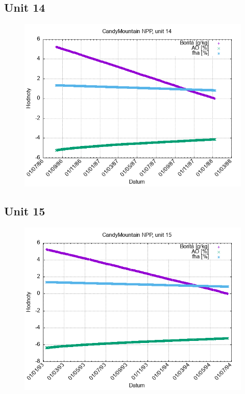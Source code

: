 \documentclass{article}
\begin{document}
\subsection*{Unit 14}
\begin{figure}[h!]
\centering
\includegraphics[width=14cm]{./grafy/CandyMountain14.png}
\end{figure}
\clearpage
\subsection*{Unit 15}
\begin{figure}[h!]
\centering
\includegraphics[width=14cm]{./grafy/CandyMountain15.png}
\end{figure}
\clearpage
\end{document}
